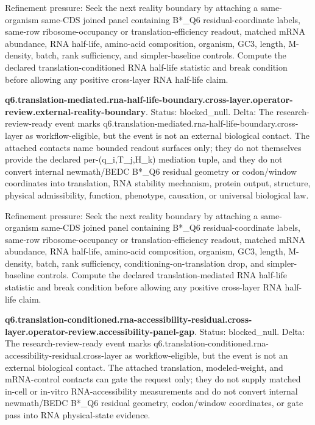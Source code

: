 Refinement pressure: Seek the next reality boundary by attaching a same-organism same-CDS joined panel containing B*\_Q6 residual-coordinate labels, same-row ribosome-occupancy or translation-efficiency readout, matched mRNA abundance, RNA half-life, amino-acid composition, organism, GC3, length, M-density, batch, rank sufficiency, and simpler-baseline controls. Compute the declared translation-conditioned RNA half-life statistic and break condition before allowing any positive cross-layer RNA half-life claim.

\textbf{q6.translation-mediated.rna-half-life-boundary.cross-layer.operator-review.external-reality-boundary}. Status: blocked\_null. Delta: The research-review-ready event marks q6.translation-mediated.rna-half-life-boundary.cross-layer as workflow-eligible, but the event is not an external biological contact. The attached contacts name bounded readout surfaces only; they do not themselves provide the declared per-(q\_i,T\_j,H\_k) mediation tuple, and they do not convert internal newmath/BEDC B*\_Q6 residual geometry or codon/window coordinates into translation, RNA stability mechanism, protein output, structure, physical admissibility, function, phenotype, causation, or universal biological law.

Refinement pressure: Seek the next reality boundary by attaching a same-organism same-CDS joined panel containing B*\_Q6 residual-coordinate labels, same-row ribosome-occupancy or translation-efficiency readout, matched mRNA abundance, RNA half-life, amino-acid composition, organism, GC3, length, M-density, batch, rank sufficiency, conditioning-on-translation drop, and simpler-baseline controls. Compute the declared translation-mediated RNA half-life statistic and break condition before allowing any positive cross-layer RNA half-life claim.

\textbf{q6.translation-conditioned.rna-accessibility-residual.cross-layer.operator-review.accessibility-panel-gap}. Status: blocked\_null. Delta: The research-review-ready event marks q6.translation-conditioned.rna-accessibility-residual.cross-layer as workflow-eligible, but the event is not an external biological contact. The attached translation, modeled-weight, and mRNA-control contacts can gate the request only; they do not supply matched in-cell or in-vitro RNA-accessibility measurements and do not convert internal newmath/BEDC B*\_Q6 residual geometry, codon/window coordinates, or gate pass into RNA physical-state evidence.


